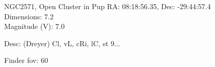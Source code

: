 \begin{block}{NGC2571, Open Cluster in Pup}
    RA: 08:18:56.35, Dec: -29:44:57.4 \\ 
    Dimensions: 7.2 \\ 
    Magnitude (V): 7.0


    Desc: (Dreyer) Cl, vL, cRi, lC, st 9... 

    Finder fov: 60 

     
\end{block}
